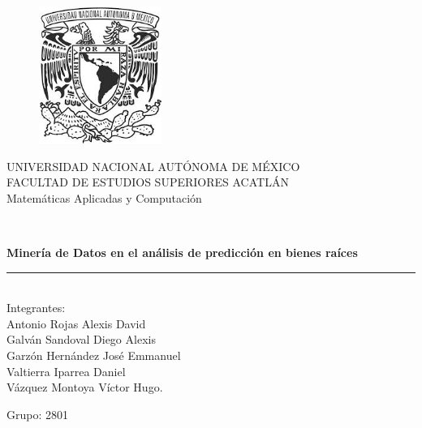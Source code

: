 \documentclass[a4paper,12pt]{article}
\begin{document}
\begin{titlepage}\sloppy
\begin{center}
\vspace{2cm}
\begin{figure}[htb]
\begin{center}
\includegraphics[width=4cm]{UNAM.jpeg}
\end{center}
\end{figure}
UNIVERSIDAD NACIONAL AUTÓNOMA DE MÉXICO\\
FACULTAD DE ESTUDIOS SUPERIORES ACATLÁN\\
\vspace{0.15in}
Matemáticas Aplicadas y Computación\\
\vspace{0.6cm}
\vspace{0.6cm}
\begin{Large}
\textbf{} \\
\end{Large}
\vspace{0.3cm}
\begin{large}
\textbf{\Huge{Minería de Datos en el análisis de predicción en bienes raíces}}\\
\end{large}
\vspace{0.3cm}
\rule{80mm}{0.1mm}\\
\vspace{0.1in}
Integrantes:\\
\vspace{2cm}
Antonio Rojas Alexis David\\
\vspace{0.1cm}
Galván Sandoval Diego Alexis\\
\vspace{0.1cm}
Garzón Hernández José Emmanuel\\
\vspace{0.1cm}
Valtierra Iparrea Daniel\\
\vspace{0.1cm}
Vázquez Montoya Víctor Hugo.\\
\vspace{2cm}
\begin{large}
Grupo: 2801
\end{large}
\end{center}
\end{titlepage}
\tableofcontents
\end{document}
